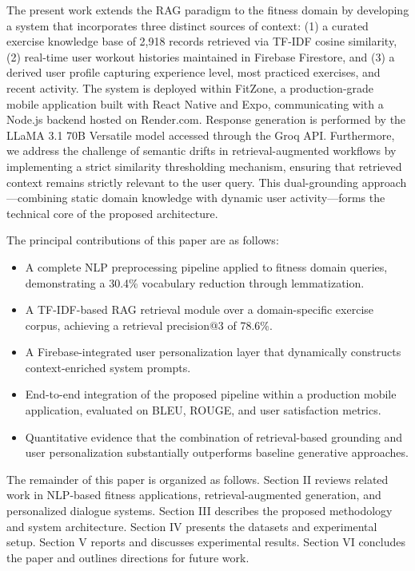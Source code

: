 \documentclass[conference]{IEEEtran}
\begin{document}
The present work extends the RAG paradigm to the fitness domain by developing a system that incorporates three distinct sources of context: (1) a curated exercise knowledge base of 2,918 records retrieved via TF-IDF cosine similarity, (2) real-time user workout histories maintained in Firebase Firestore, and (3) a derived user profile capturing experience level, most practiced exercises, and recent activity. The system is deployed within FitZone, a production-grade mobile application built with React Native and Expo, communicating with a Node.js backend hosted on Render.com. Response generation is performed by the LLaMA 3.1 70B Versatile model accessed through the Groq API. Furthermore, we address the challenge of semantic drifts in retrieval-augmented workflows by implementing a strict similarity thresholding mechanism, ensuring that retrieved context remains strictly relevant to the user query. This dual-grounding approach—combining static domain knowledge with dynamic user activity—forms the technical core of the proposed architecture.

The principal contributions of this paper are as follows:
\begin{itemize}
    \item A complete NLP preprocessing pipeline applied to fitness domain queries, demonstrating a 30.4\% vocabulary reduction through lemmatization.
    \item A TF-IDF-based RAG retrieval module over a domain-specific exercise corpus, achieving a retrieval precision@3 of 78.6\%.
    \item A Firebase-integrated user personalization layer that dynamically constructs context-enriched system prompts.
    \item End-to-end integration of the proposed pipeline within a production mobile application, evaluated on BLEU, ROUGE, and user satisfaction metrics.
    \item Quantitative evidence that the combination of retrieval-based grounding and user personalization substantially outperforms baseline generative approaches.
\end{itemize}

The remainder of this paper is organized as follows. Section II reviews related work in NLP-based fitness applications, retrieval-augmented generation, and personalized dialogue systems. Section III describes the proposed methodology and system architecture. Section IV presents the datasets and experimental setup. Section V reports and discusses experimental results. Section VI concludes the paper and outlines directions for future work.
\end{document}
